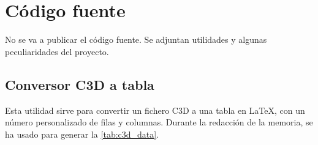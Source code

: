 \chapter{Código fuente}
\noindent No se va a publicar el código fuente. Se adjuntan utilidades y algunas peculiaridades del proyecto.

\section{Conversor \acs{C3D} a tabla} \label{apx:c3d_latex_py}

Esta utilidad sirve para convertir un fichero \ac{C3D} a una tabla en \LaTeX, con un número personalizado de filas y columnas. Durante la redacción de la memoria, se ha usado para generar la \autoref{tab:c3d_data}.

